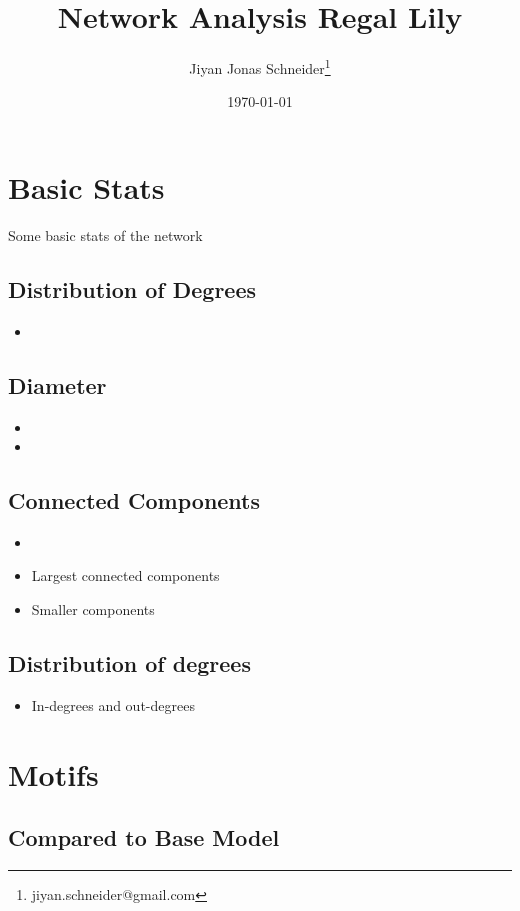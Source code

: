\documentclass[11pt]{beamer}
\author{Jiyan Jonas Schneider\thanks{jiyan.schneider@gmail.com}}
\date{\today}
\title{Network Analysis Regal Lily}
\begin{document}
\maketitle
\tableofcontents

\section*{Basic Stats}
\label{sec:orgeb4fd07}
Some basic stats of the network
\subsection*{Distribution of Degrees}
\label{sec:orgb928d60}
\begin{itemize}
\item{}
\end{itemize}
\subsection*{Diameter}
\label{sec:org5822796}
\begin{itemize}
\item\relax [ Diameter ]
\item{}
\end{itemize}
\subsection*{Connected Components}
\label{sec:orgd9bdd9b}
\begin{itemize}
\item{}
\item Largest connected components
\item Smaller components
\end{itemize}
\subsection*{Distribution of degrees}
\label{sec:org361aefe}
\begin{itemize}
\item In-degrees and out-degrees
\end{itemize}
\section*{Motifs}
\label{sec:orge565dfd}
\subsection*{Compared to Base Model}
\label{sec:org9ea1fe6}
\end{document}

